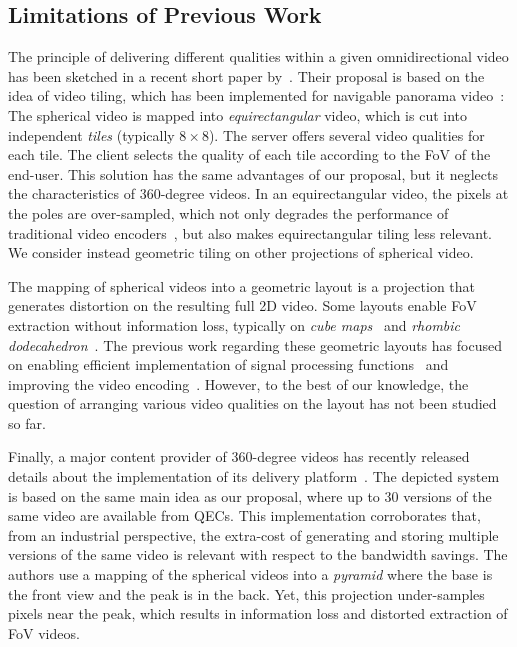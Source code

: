 

\subsection{Limitations of Previous Work}

The principle of delivering different qualities within a given omnidirectional video has 
been sketched 
in a recent short paper by~\citet{ochi_live_2015}. Their proposal is based on the idea of video
tiling, which has been implemented for navigable panorama 
video~\cite{sanchez_compressed_2015,wang_mixing_2014,gaddam_tiling_2015}: 
The spherical video is mapped into \emph{equirectangular} video, which
is cut into independent \emph{tiles} (typically $8\times 8$). The server offers several
video qualities for each tile. The client selects the quality of each tile according to 
the \ac{FoV} of the end-user. This
solution has the same advantages of our proposal, but it neglects
the characteristics of 360-degree
videos. In an equirectangular video, the pixels 
at the poles are over-sampled, which not only degrades the
performance of traditional video encoders~\cite{wojciechowski_h.264_2006,yu_framework_2015}, but also 
makes equirectangular tiling less relevant. We consider instead geometric tiling on
other projections of spherical video.


The mapping of spherical videos into a geometric layout is a projection that generates 
distortion on the resulting
full 2D video. Some layouts enable \ac{FoV} extraction without information 
loss, typically on \emph{cube maps}~\cite{Ng2005} and 
\emph{rhombic dodecahedron}~\cite{fu_rhombic_2009}. The previous work regarding 
these
geometric layouts has focused on enabling efficient implementation of signal processing 
functions~\cite{kazhdan_metric-aware_2010} and improving the video 
encoding~\cite{tosic_low_2009}. 
However, to the best of our knowledge, the 
question of arranging various video qualities on the layout has not been studied so far.

Finally, a major content provider of 360-degree videos has recently released details about the 
implementation of its delivery platform~\cite{facebook}. The depicted system is based 
on the same
main idea as our proposal, where up to 30 versions of the same video are available from
\acp{QEC}. This implementation corroborates that, from an industrial perspective, the 
extra-cost of
generating and storing multiple versions of the same video is relevant with respect 
to the bandwidth
savings. The authors use a mapping of the spherical videos into a \emph{pyramid} 
where the 
base is the front
view and the peak is in the back. Yet, this projection under-samples pixels near the peak, 
which 
results in 
information loss and distorted extraction of \ac{FoV} videos.

